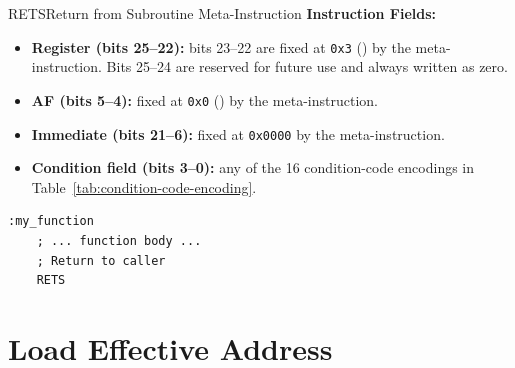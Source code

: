 \begin{instructionbox}{RETS}{Return from Subroutine Meta-Instruction}
	\textbf{Instruction Fields:}
	\begin{itemize}
		\item \textbf{Register (bits 25--22):} bits 23--22 are fixed at \texttt{0x3} () by the
		      meta-instruction. Bits 25--24 are reserved for future use and always written as zero.
		\item \textbf{AF (bits 5--4):} fixed at \texttt{0x0} () by the meta-instruction.
		\item \textbf{Immediate (bits 21--6):} fixed at \texttt{0x0000} by the meta-instruction.
		\item \textbf{Condition field (bits 3--0):} any of the 16 condition-code encodings in
		      Table~\ref{tab:condition-code-encoding}.
	\end{itemize}

	\begin{example}
		\begin{lstlisting}
:my_function
    ; ... function body ...
    ; Return to caller
    RETS
		\end{lstlisting}
		\caption{Returning from a Subroutine}
	\end{example}
\end{instructionbox}

\section{Load Effective Address}

